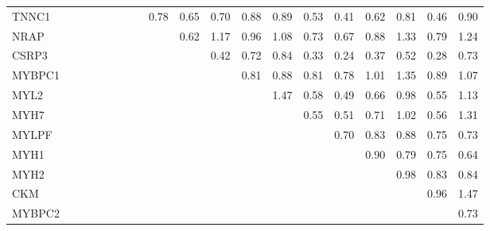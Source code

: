 \begin{longtable}{lrrrrrrrrrrrrrrrrrr}
TNNC1   &             &             &           &             &               &            &             &       0.78 &        0.65 &         0.70 &       0.88 &       0.89 &        0.53 &       0.41 &       0.62 &      0.81 &         0.46 &     0.90 \\
NRAP    &             &             &           &             &               &            &             &            &        0.62 &         1.17 &       0.96 &       1.08 &        0.73 &       0.67 &       0.88 &      1.33 &         0.79 &     1.24 \\
CSRP3   &             &             &           &             &               &            &             &            &             &         0.42 &       0.72 &       0.84 &        0.33 &       0.24 &       0.37 &      0.52 &         0.28 &     0.73 \\
MYBPC1  &             &             &           &             &               &            &             &            &             &              &       0.81 &       0.88 &        0.81 &       0.78 &       1.01 &      1.35 &         0.89 &     1.07 \\
MYL2    &             &             &           &             &               &            &             &            &             &              &            &       1.47 &        0.58 &       0.49 &       0.66 &      0.98 &         0.55 &     1.13 \\
MYH7    &             &             &           &             &               &            &             &            &             &              &            &            &        0.55 &       0.51 &       0.71 &      1.02 &         0.56 &     1.31 \\
MYLPF   &             &             &           &             &               &            &             &            &             &              &            &            &             &       0.70 &       0.83 &      0.88 &         0.75 &     0.73 \\
MYH1    &             &             &           &             &               &            &             &            &             &              &            &            &             &            &       0.90 &      0.79 &         0.75 &     0.64 \\
MYH2    &             &             &           &             &               &            &             &            &             &              &            &            &             &            &            &      0.98 &         0.83 &     0.84 \\
CKM     &             &             &           &             &               &            &             &            &             &              &            &            &             &            &            &           &         0.96 &     1.47 \\
MYBPC2  &             &             &           &             &               &            &             &            &             &              &            &            &             &            &            &           &              &     0.73 \\
\end{longtable}


